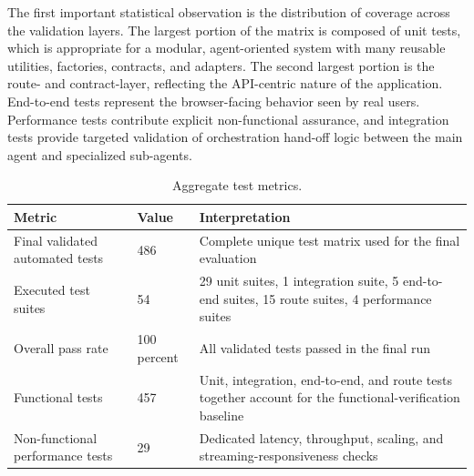\documentclass[11pt,a4paper]{report}
\begin{document}
The first important statistical observation is the distribution of coverage
across the validation layers. The largest portion of the matrix is composed
of unit tests, which is appropriate for a modular, agent-oriented system
with many reusable utilities, factories, contracts, and adapters. The second
largest portion is the route- and contract-layer, reflecting the API-centric
nature of the application. End-to-end tests represent the browser-facing
behavior seen by real users. Performance tests contribute explicit
non-functional assurance, and integration tests provide targeted validation
of orchestration hand-off logic between the main agent and specialized
sub-agents.

\begin{table}[H]
\centering
\begin{tabular}{@{}L{5.2cm} L{2.2cm} L{6.2cm}@{}}
\toprule
\textbf{Metric} & \textbf{Value} & \textbf{Interpretation}\\
\midrule
Final validated automated tests & 486          & Complete unique test matrix used for the final evaluation\\
Executed test suites             & 54           & 29 unit suites, 1 integration suite, 5 end-to-end suites, 15 route suites, 4 performance suites\\
Overall pass rate                & 100 percent  & All validated tests passed in the final run\\
Functional tests                 & 457          & Unit, integration, end-to-end, and route tests together account for the functional-verification baseline\\
Non-functional performance tests & 29           & Dedicated latency, throughput, scaling, and streaming-responsiveness checks\\
\bottomrule
\end{tabular}
\caption{Aggregate test metrics.}
\end{table}
\end{document}
